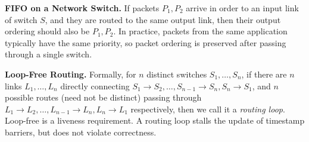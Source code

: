 \textbf{FIFO on a Network Switch.}
If packets $P_1, P_2$ arrive in order to an input link of switch $S$, and they are routed to the same output link, then their output ordering should also be $P_1, P_2$.
In practice, packets from the same application typically have the same priority, so packet ordering is preserved after passing through a single switch.

\textbf{Loop-Free Routing.}
Formally, for $n$ distinct switches $S_1, \ldots, S_n$, if there are $n$ links $L_1, \ldots, L_n$ directly connecting $S_1 \rightarrow S_2, \ldots, S_{n-1} \rightarrow S_n, S_n \rightarrow S_1$, and $n$ possible routes (need not be distinct) passing through $L_1 \rightarrow L_2, \ldots, L_{n-1} \rightarrow L_n, L_n \rightarrow L_1$ respectively, then we call it a \textit{routing loop}.
Loop-free is a liveness requirement.
A routing loop stalls the update of timestamp barriers, but does not violate correctness.
\fi
